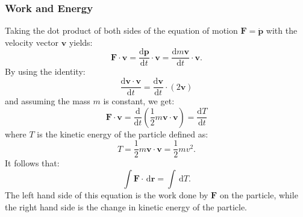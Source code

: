 \subsubsection{Work and Energy}
Taking the dot product of both sides of the equation of motion $\textbf{F} = \dot{\textbf{p}}$ with the velocity vector $\textbf{v}$ yields:
\[ 
\textbf{F} \cdot \textbf{v} = \frac{\mathrm{d}\textbf{p}}{\mathrm{d}t} \cdot \textbf{v} = \frac{\mathrm{d} m \textbf{v}}{\mathrm{d}t} \cdot \textbf{v}
.\]
By using the identity:
\[ 
\frac{\mathrm{d} \textbf{v}\cdot \textbf{v}}{\mathrm{d}t} = \frac{\mathrm{d}\textbf{v}}{\mathrm{d}t} \cdot \left( 2 \textbf{v} \right)
\]
and assuming the mass $m$ is constant, we get:
\[ 
\textbf{F} \cdot \textbf{v} = \frac{\mathrm{d}}{\mathrm{d}t} \left( \frac{1}{2} m \textbf{v} \cdot \textbf{v} \right) = \frac{\mathrm{d}T}{\mathrm{d}t} 
\]
where $T$ is the kinetic energy of the particle defined as:
\[ 
T = \frac{1}{2} m \textbf{v} \cdot \textbf{v} = \frac{1}{2} mv^2
.\]
It follows that:
\[ 
\int \textbf{F} \cdot \, \mathrm{d}\textbf{r} = \int \, \mathrm{d}T
.\]
The left hand side of this equation is the work done by $\textbf{F}$ on the particle, while the right hand side is the change in kinetic energy of the particle. 


